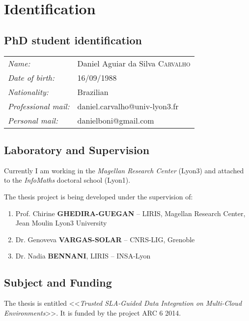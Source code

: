 \chapter{Identification}
\label{chap:identification}
\minitoc

\section{PhD student identification}
\begin{flushleft}
\begin{tabular}{ll}
\textit{Name:} & Daniel Aguiar da Silva \textsc{Carvalho}\\
\textit{Date of birth:} & 16/09/1988\\
\textit{Nationality:} & Brazilian\\
\textit{Professional mail:} & daniel.carvalho@univ-lyon3.fr\\
\textit{Personal mail:} & danielboni@gmail.com\\
\end{tabular}
\end{flushleft}

\section{Laboratory and Supervision}
Currently I am working in the \textit{Magellan Research Center} (Lyon3) and attached to the \textit{InfoMaths} doctoral school (Lyon1).

\bigskip
\noindent The thesis project is being developed under the supervision of:
\begin{enumerate}[]
\item Prof. Chirine \textbf{GHEDIRA-GUEGAN} -- LIRIS, Magellan Research Center, Jean Moulin Lyon3 University
\item Dr. Genoveva \textbf{VARGAS-SOLAR} -- CNRS-LIG, Grenoble
\item Dr. Nadia \textbf{BENNANI}, LIRIS -- INSA-Lyon
\end{enumerate}


\section{Subject and Funding}

The thesis is entitled <<\textsl{Trusted SLA-Guided Data Integration on Multi-Cloud Environments}>>. It is funded by the project ARC 6 2014. 